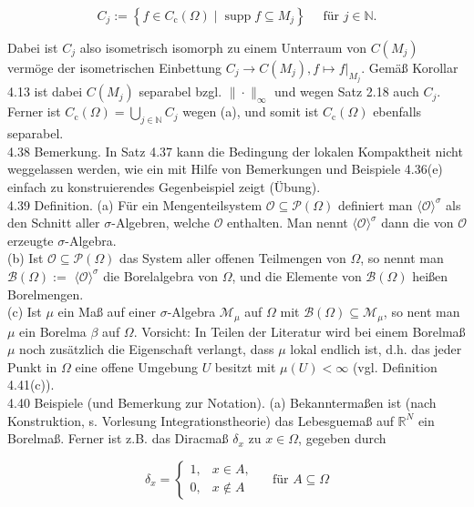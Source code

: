 \documentclass[10pt, letterpaper]{article}
\begin{document}
$$
C_{j}:=\left\{f \in C_{\mathrm{c}}(\Omega) \mid \operatorname{supp} f \subseteq M_{j}\right\} \quad \text { für } j \in \mathbb{N} .
$$

Dabei ist $C_{j}$ also isometrisch isomorph zu einem Unterraum von $C\left(M_{j}\right)$ vermöge der isometrischen Einbettung $C_{j} \rightarrow C\left(M_{j}\right),\left.f \mapsto f\right|_{M_{j}}$. Gemäß Korollar 4.13 ist dabei $C\left(M_{j}\right)$ separabel bzgl. $\|\cdot\|_{\infty}$ und wegen Satz 2.18 auch $C_{j}$. Ferner ist $C_{\mathrm{c}}(\Omega)=\bigcup_{j \in \mathbb{N}} C_{j}$ wegen (a), und somit ist $C_{\mathrm{c}}(\Omega)$ ebenfalls separabel.\\
4.38 Bemerkung. In Satz 4.37 kann die Bedingung der lokalen Kompaktheit nicht weggelassen werden, wie ein mit Hilfe von Bemerkungen und Beispiele 4.36(e) einfach zu konstruierendes Gegenbeispiel zeigt (Übung).\\
4.39 Definition. (a) Für ein Mengenteilsystem $\mathcal{O} \subseteq \mathcal{P}(\Omega)$ definiert man $\langle\mathcal{O}\rangle^{\sigma}$ als den Schnitt aller $\sigma$-Algebren, welche $\mathcal{O}$ enthalten. Man nennt $\langle\mathcal{O}\rangle^{\sigma}$ dann die von $\mathcal{O}$ erzeugte $\sigma$-Algebra.\\
(b) Ist $\mathcal{O} \subseteq \mathcal{P}(\Omega)$ das System aller offenen Teilmengen von $\Omega$, so nennt man $\mathcal{B}(\Omega):=$ $\langle\mathcal{O}\rangle^{\sigma}$ die Borelalgebra von $\Omega$, und die Elemente von $\mathcal{B}(\Omega)$ heißen Borelmengen.\\
(c) Ist $\mu$ ein Maß auf einer $\sigma$-Algebra $\mathcal{M}_{\mu}$ auf $\Omega$ mit $\mathcal{B}(\Omega) \subseteq \mathcal{M}_{\mu}$, so nent man $\mu$ ein Borelma $\beta$ auf $\Omega$. Vorsicht: In Teilen der Literatur wird bei einem Borelmaß $\mu$ noch zusätzlich die Eigenschaft verlangt, dass $\mu$ lokal endlich ist, d.h. das jeder Punkt in $\Omega$ eine offene Umgebung $U$ besitzt mit $\mu(U)<\infty$ (vgl. Definition 4.41(c)).\\
4.40 Beispiele (und Bemerkung zur Notation). (a) Bekanntermaßen ist (nach Konstruktion, s. Vorlesung Integrationstheorie) das Lebesguemaß auf $\mathbb{R}^{N}$ ein Borelmaß. Ferner ist z.B. das Diracmaß $\delta_{x}$ zu $x \in \Omega$, gegeben durch

$$
\delta_{x}=\left\{\begin{array}{ll}
1, & x \in A, \\
0, & x \notin A
\end{array} \quad \text { für } A \subseteq \Omega\right.
$$
\end{document}
